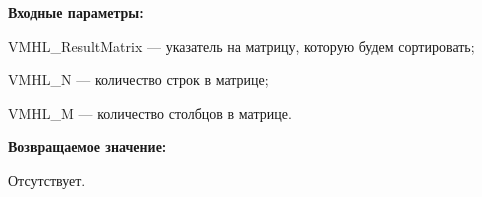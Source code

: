 \textbf{Входные параметры:}
 
VMHL\_ResultMatrix --- указатель на матрицу, которую будем сортировать;
 
VMHL\_N --- количество строк в матрице;
 
VMHL\_M --- количество столбцов в матрице.

\textbf{Возвращаемое значение:}

Отсутствует.